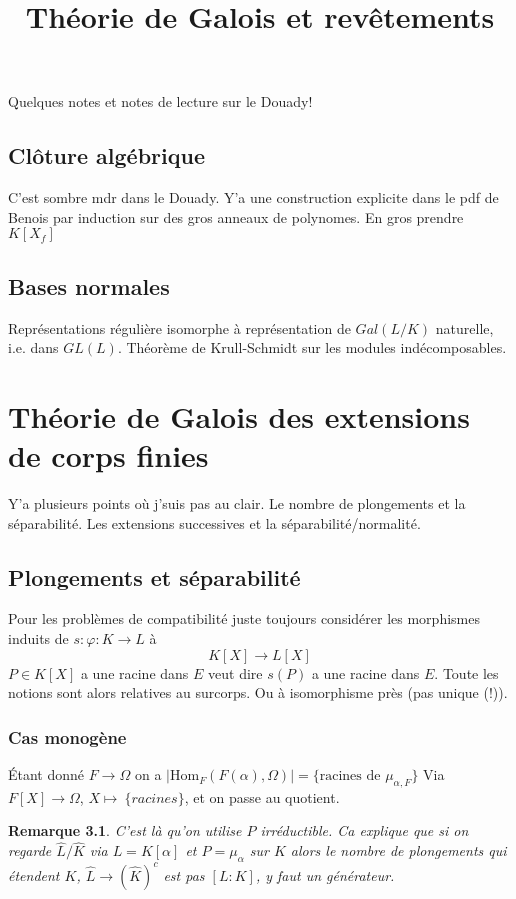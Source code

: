 \documentclass[a4paper,12pt]{book}
\title{Théorie de Galois et revêtements}
\date{}
\newcommand{\Hom}{\textrm{Hom}}
\theoremstyle{plain}
\newtheorem{rem}{Remarque}
\theoremstyle{definition}
\theoremstyle{remark}
\begin{document}
\maketitle
\tableofcontents
Quelques notes et notes de lecture sur le Douady!

\section{Clôture algébrique}
C'est sombre mdr dans le Douady. Y'a une construction explicite
dans le pdf de Benois par induction sur des gros anneaux de 
polynomes. En gros prendre $K[X_f]$


\section{Bases normales}
Représentations régulière isomorphe à
représentation de $Gal(L/K)$ naturelle,
i.e. dans $GL(L)$. Théorème de Krull-Schmidt
sur les modules indécomposables.

\chapter{Théorie de Galois des extensions de corps finies}
Y'a plusieurs points où j'suis pas au clair. Le
nombre de plongements et la séparabilité. Les
extensions successives et la séparabilité/normalité.

\section{Plongements et séparabilité}
Pour les problèmes de compatibilité juste toujours considérer les
morphismes induits de $s\colon \varphi\colon K\to L$ à
\[K[X]\to L[X]\]
$P\in K[X]$ a une racine dans $E$ veut dire $s(P)$ a une racine
dans $E$. Toute les notions sont alors relatives au surcorps.
Ou à isomorphisme près (pas unique (!)).
\subsection{Cas monogène}
Étant donné $F\to \Omega$ on a 
$|\Hom_F(F(\alpha),\Omega)|=\{\textrm{racines de }\mu_{\alpha,F}\}$
Via $F[X]\to \Omega$, $X\mapsto~\{racines\}$, et on passe au 
quotient.

\begin{rem}
  C'est là qu'on utilise $P$ irréductible. Ca explique que
  si on regarde $\hat L/\hat K$ via $L=K[\alpha]$ et $P=\mu_\alpha$
  sur $K$ alors le nombre de plongements qui étendent $K$,
  $\hat L\to (\hat K)^c$ est pas $[L:K]$, y faut un générateur.
\end{rem}
\end{document}
